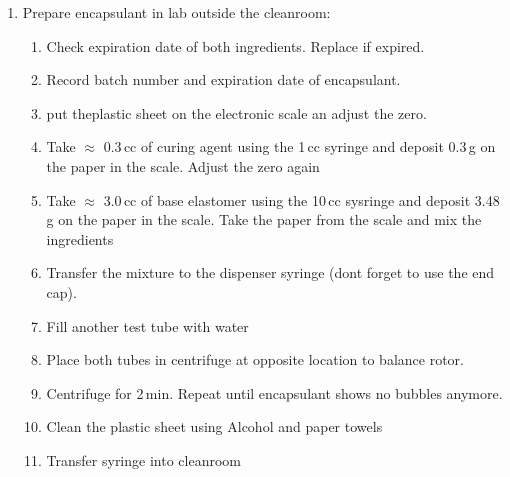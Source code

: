 \documentclass[12pt]{unlsilabsop}
\begin{document}
\begin{enumerate}
\begin{enumerate}
    \end{enumerate}
  \item Prepare encapsulant in lab outside the cleanroom:\label{enum:prepencapsulant}
    \begin{enumerate}
        \item Check expiration date of both ingredients. Replace if expired.
	\item Record batch number and expiration date of encapsulant.
        \item put theplastic sheet on the electronic scale an adjust the zero.
	\item Take $\approx$ 0.3\,cc of curing agent using the 1\,cc syringe and deposit 0.3\,g on the paper in the scale. Adjust the zero again 
        \item Take $\approx$ 3.0\,cc of base elastomer using the 10\,cc sysringe and deposit 3.48\,g on the paper in the scale. Take the paper from the scale and mix the ingredients
        \item Transfer the mixture to the dispenser syringe (dont forget to use the end cap).  
	\item Fill another test tube with water
	\item Place both tubes in centrifuge at opposite location to balance rotor.
	\item Centrifuge for 2\,min. Repeat until encapsulant shows no bubbles anymore.
        \item Clean the plastic sheet using Alcohol and paper towels
	\item Transfer syringe into cleanroom


\end{enumerate}
\end{enumerate}
\end{document}

